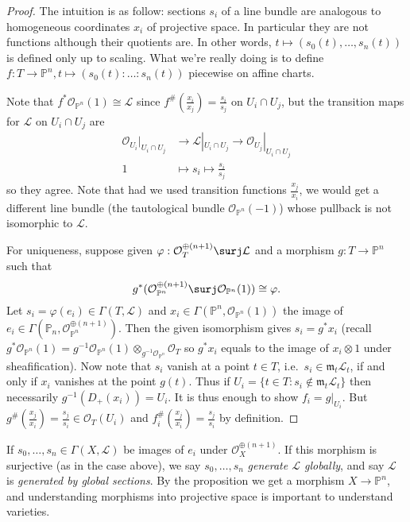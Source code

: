 \documentclass[a4paper]{article}
\renewcommand*{\P}{\mathbb{P}}
\newcommand{\sh}[1]{\mathcal{#1}} %
\begin{document}
\begin{proof}
  The intuition is as follow: sections \(s_i\) of a line bundle are analogous to homogeneous coordinates \(x_i\) of projective space. In particular they are not functions although their quotients are. In other words, \(t \mapsto (s_0(t), \dots, s_n(t))\) is defined only up to scaling. What we're really doing is to define \(f: T \to \P^n, t \mapsto (s_0(t): \dots : s_n(t))\) piecewise on affine charts.

  Note that \(f^* \sh O_{\P^n}(1) \cong \sh L\) since \(f^\#(\frac{x_i}{x_j}) = \frac{s_i}{s_j}\) on \(U_i \cap U_j\), but the transition maps for \(\sh L\) on \(U_i \cap U_j\) are
  \begin{align*}
    \sh O_{U_i}|_{U_i \cap U_j} &\to \sh L|_{U_i \cap U_j} \to \sh O_{U_j}|_{U_i \cap U_j} \\
    1 &\mapsto s_i \mapsto \frac{s_i}{s_j}
  \end{align*}
  so they agree. Note that had we used transition functions \(\frac{x_j}{x_i}\), we would get a different line bundle (the tautological bundle \(\sh O_{\P^n}(-1)\)) whose pullback is not isomorphic to \(\sh L\).

  For uniqueness, suppose given \(\varphi: \sh O_T^{\oplus(n + 1)} \surj \sh L\) and a morphism \(g: T \to \P^n\) such that
  \[
    g^*(\sh O_{\P^n}^{\oplus(n + 1)} \surj \sh O_{\P^n}(1)) \cong \varphi.
  \]
  Let \(s_i = \varphi(e_i) \in \Gamma(T, \sh L)\) and \(x_i \in \Gamma(\P^n, \sh O_{\P^n}(1))\) the image of \(e_i \in \Gamma(\P_n, \sh O_{\P^n}^{\oplus(n + 1)})\). Then the given isomorphism gives \(s_i = g^*x_i\) (recall \(g^* \sh O_{\P^n}(1) = g^{-1} \sh O_{\P^n}(1) \otimes_{g^{-1} \sh O_{\P^n}} \sh O_T\) so \(g^*x_i\) equals to the image of \(x_i \otimes 1\) under sheafification). Now note that \(s_i\) vanish at a point \(t \in T\), i.e.\ \(s_i \in \mathfrak m_t \sh L_t\), if and only if \(x_i\) vanishes at the point \(g(t)\). Thus if \(U_i = \{t \in T: s_i \notin \mathfrak m_t \sh L_t\}\) then necessarily \(g^{-1}(D_+(x_i)) = U_i\). It is thus enough to show \(f_i = g|_{U_i}\). But \(g^\#(\frac{x_j}{x_i}) = \frac{s_j}{s_i} \in \sh O_T(U_i)\) and \(f_i^\#(\frac{x_j}{x_i}) = \frac{s_j}{s_i}\) by definition.
\end{proof}

If \(s_0, \dots, s_n \in \Gamma(X, \sh L)\) be images of \(e_i\) under \(\sh O_X^{\oplus(n + 1)}\). If this morphism is surjective (as in the case above), we say \(s_0, \dots, s_n\) \emph{generate \(\sh L\) globally}, and say \(\sh L\) is \emph{generated by global sections}. By the proposition we get a morphism \(X \to \P^n\), and understanding morphisms into projective space is important to understand varieties.
\end{document}
